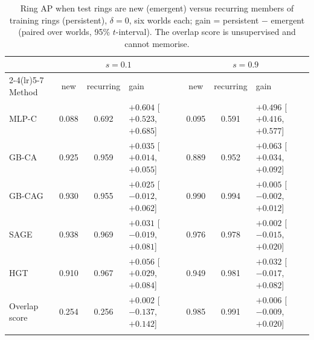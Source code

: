 \begin{table}[h]
\caption{Ring AP when test rings are new (emergent) versus recurring members of training rings (persistent), $\delta=0$, six worlds each; gain = persistent $-$ emergent (paired over worlds, 95\% $t$-interval). The overlap score is unsupervised and cannot memorise.}\label{tab:protocol}
\scriptsize
\setlength{\tabcolsep}{3pt}
\begin{tabular}{@{}lccp{2.2cm}ccp{2.2cm}@{}}
\toprule
 & \multicolumn{3}{c}{$s=0.1$} & \multicolumn{3}{c}{$s=0.9$} \\
\cmidrule(lr){2-4}\cmidrule(lr){5-7}
Method & new & recurring & gain & new & recurring & gain \\
\midrule
MLP-C & 0.088 & 0.692 & $+0.604$ [$+0.523$, $+0.685$] & 0.095 & 0.591 & $+0.496$ [$+0.416$, $+0.577$] \\
GB-CA & 0.925 & 0.959 & $+0.035$ [$+0.014$, $+0.055$] & 0.889 & 0.952 & $+0.063$ [$+0.034$, $+0.092$] \\
GB-CAG & 0.930 & 0.955 & $+0.025$ [$-0.012$, $+0.062$] & 0.990 & 0.994 & $+0.005$ [$-0.002$, $+0.012$] \\
SAGE & 0.938 & 0.969 & $+0.031$ [$-0.019$, $+0.081$] & 0.976 & 0.978 & $+0.002$ [$-0.015$, $+0.020$] \\
HGT & 0.910 & 0.967 & $+0.056$ [$+0.029$, $+0.084$] & 0.949 & 0.981 & $+0.032$ [$-0.017$, $+0.082$] \\
Overlap score & 0.254 & 0.256 & $+0.002$ [$-0.137$, $+0.142$] & 0.985 & 0.991 & $+0.006$ [$-0.009$, $+0.020$] \\
\botrule
\end{tabular}
\end{table}